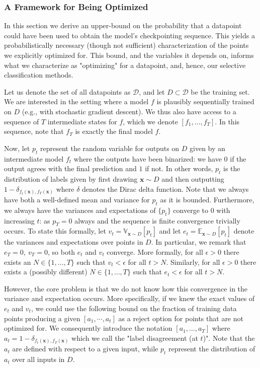 \subsubsection{A Framework for Being Optimized}
\label{ssec:reject_cond}

In this section we derive an upper-bound on the probability that a datapoint could have been used to obtain the model's checkpointing sequence. This yields a probabilistically necessary (though not sufficient) characterization of the points we explicitly optimized for. This bound, and the variables it depends on, informs what we characterize as "optimizing" for a datapoint, and, hence, our selective classification methods.

Let us denote the set of all datapoints as $\mathcal{D}$, and let $D \subset \mathcal{D}$ be the training set. We are interested in the setting where a model $f$ is plausibly sequentially trained on $D$ (e.g., with stochastic gradient descent). We thus also have access to a sequence of $T$ intermediate states for $f$, which we denote $[f_1,\ldots, f_T]$. In this sequence, note that $f_T$ is exactly the final model $f$. 

Now, let $p_{t}$ represent the random variable for outputs on $D$ given by an intermediate model $f_t$ where the outputs have been binarized: we have $0$ if the output agrees with the final prediction and $1$ if not. In other words, $p_{t}$ is the distribution of labels given by first drawing $\bm{x} \sim D$ and then outputting $1- \delta_{f_t(\bm{x}),f_T(\bm{x})}$ where $\delta$ denotes the Dirac delta function. Note that we always have both a well-defined mean and variance for $p_{t}$ as it is bounded. Furthermore, we always have the variances and expectations of $\{p_{t}\}$ converge to $0$ with increasing $t$: as $p_{T} = 0$ always and the sequence is finite convergence trivially occurs. To state this formally, let $v_t = \mathbb{V}_{\bm{x} \sim D}[p_{t}]$ and let $e_t = \mathbb{E}_{\bm{x} \sim D}[p_{t}]$ denote the variances and expectations over points in $D$. In particular, we remark that $e_T=0,\ v_T = 0$, so both $e_t$ and $v_t$ converge. More formally, for all $ \epsilon > 0$ there exists an $N \in \{1,\ldots, T\}$ such that $v_t < \epsilon$ for all $t > N$. Similarly, for all $\epsilon > 0$ there exists a (possibly different) $N \in \{1,\ldots, T\}$ such that $e_t < \epsilon$ for all $t > N$.

However, the core problem is that we do not know how this convergence in the variance and expectation occurs. More specifically, if we knew the exact values of $e_t$ and $v_t$, we could use the following bound on the fraction of training data points producing a given $[a_1,\cdots,a_t]$ as a reject option for points that are not optimized for.  We consequently introduce the notation $[a_1,\ldots,a_T]$ where $a_t = 1- \delta_{f_t(\bm{x}),f_T(\bm{x})}$ which we call the "label disagreement (at $t$)". Note that the $a_t$ are defined with respect to a given input, while $p_t$ represent the distribution of $a_t$ over all inputs in $D$.

